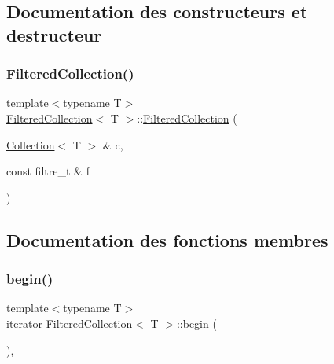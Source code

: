 \subsection{Documentation des constructeurs et destructeur}
\mbox{\label{class_filtered_collection_a78c712f40560a66d05ce97755d6c0749}} 
\subsubsection{\texorpdfstring{Filtered\+Collection()}{FilteredCollection()}}
{\footnotesize\ttfamily template$<$typename T$>$ \\
\hyperlink{class_filtered_collection}{Filtered\+Collection}$<$ T $>$\+::\hyperlink{class_filtered_collection}{Filtered\+Collection} (\begin{DoxyParamCaption}\item[{\hyperlink{class_collection}{Collection}$<$ T $>$ \&}]{c,  }\item[{const filtre\+\_\+t \&}]{f }\end{DoxyParamCaption})\hspace{0.3cm}{\ttfamily [inline]}}



\subsection{Documentation des fonctions membres}
\mbox{\label{class_filtered_collection_a114f2b1557201e523a264d549926ab0a}} 
\subsubsection{\texorpdfstring{begin()}{begin()}}
{\footnotesize\ttfamily template$<$typename T$>$ \\
\hyperlink{class_collection_a317dca4fdf1eb2e47643bb60c620f802}{iterator} \hyperlink{class_filtered_collection}{Filtered\+Collection}$<$ T $>$\+::begin (\begin{DoxyParamCaption}{ }\end{DoxyParamCaption})\hspace{0.3cm}{\ttfamily [inline]}, {\ttfamily [virtual]}}



